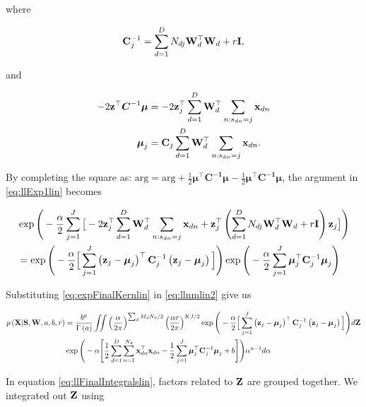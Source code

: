 	where 
	
	\begin{align}
	\mathbf{C}_j^{-1} = \sum_{d=1}^{D} N_{dj}\mathbf{W}_d^\top \mathbf{W}_d + r\mathbf{I},
	\end{align}
	
	and
	
	\begin{align}
	-2\mathbf{z}^\top \boldsymbol{C}^{-1}\boldsymbol{\mu} &=  -2 \mathbf{z}_j ^\top  \sum_{d=1}^{D}\mathbf{W}_d^\top \sum_{n:s_{dn}=j}\mathbf{x}_{dn} \notag \\
	\boldsymbol{\mu}_j &= \mathbf{C}_j  \sum_{d=1}^{D}\mathbf{W}_d^\top \sum_{n:s_{dn}=j}\mathbf{x}_{dn} .
	\end{align}
	
	By completing the square as: $\textrm{arg} = \textrm{arg} + \frac{1}{2}\boldsymbol{\mu}^\top\boldsymbol{C^{-1}}\boldsymbol{\mu} -\frac{1}{2}\boldsymbol{\mu}^\top\boldsymbol{C^{-1}}\boldsymbol{\mu}$, the argument in \eqref{eq:llExp1lin} becomes
	
	\begin{align}
	&\exp\Bigg(-\frac{\alpha}{2}\sum_{j=1}^J \big[ -2 \mathbf{z}_j ^\top  \sum_{d=1}^{D}\mathbf{W}_d^\top \sum_{n:s_{dn}=j}\mathbf{x}_{dn}+\mathbf{z}_j^\top  \left(\sum_{d=1}^{D} N_{dj}\mathbf{W}_d^\top \mathbf{W}_d + r\mathbf{I}\right) \mathbf{z}_j \big]\Bigg) \notag\\ &= \exp\Bigg(-\frac{\alpha}{2}\Big[\sum_{j=1}^{J} \left(\mathbf{z}_j-\boldsymbol{\mu}_j\right)^\top\mathbf{C}_j^{-1}\left(\mathbf{z}_j-\boldsymbol{\mu}_j\right)\Big]\Bigg)
	\exp\Bigg(-\frac{\alpha}{2}\sum_{j=1}^{J}\boldsymbol{\mu}_j^\top\mathbf{C}_j^{-1}\boldsymbol{\mu}_j\Bigg) \label{eq:expFinalKernlin}
	\end{align}
	
	
	Substituting \eqref{eq:expFinalKernlin} in \eqref{eq:llnmlin2} give us
	
	\begin{align}
	p\left(\mathbf{X}|\mathbf{S},\mathbf{W},a,b,r\right)&=\frac{b^a}{\Gamma\left(a\right)}\iint \left(\frac{\alpha}{2\pi}\right)^{\sum_d M_d N_d /2}\left(\frac{\alpha r}{2\pi}\right)^{KJ/2}\exp\Bigg(-\frac{\alpha}{2}\Big[\sum_{j=1}^{J} \left(\mathbf{z}_j-\boldsymbol{\mu}_j\right)^\top\mathbf{C}_j^{-1}\left(\mathbf{z}_j-\boldsymbol{\mu}_j\right)\Big]\Bigg)d\boldsymbol{\mathrm{Z}} \notag\\
	&\exp\Bigg(-\alpha\Bigg[\frac{1}{2} \sum_{d=1}^{D}\sum_{n=1}^{N_d}\mathbf{x}_{dn}^\top \mathbf{x}_{dn}  -\frac{1}{2}\sum_{j=1}^{J}\boldsymbol{\mu}_j^\top\mathbf{C}_j^{-1}\boldsymbol{\mu}_j +b \Bigg]\Bigg)\alpha^{a-1}d\alpha \label{eq:llFinalIntegralslin}
	\end{align}
	
	In equation \eqref{eq:llFinalIntegralslin}, factors related to $\boldsymbol{\mathrm{Z}}$ are grouped together. We integrated out $\boldsymbol{\mathrm{Z}}$ using
	
